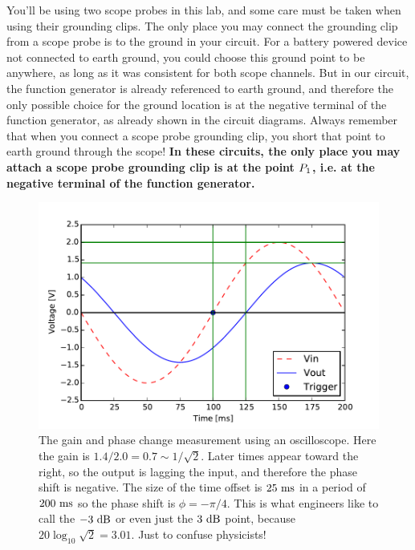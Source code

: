 \documentclass[12pt]{article}
\begin{document}
\noindent
You'll be using two scope probes in this lab, and some care must be taken when using their grounding clips.  The only place you may connect the grounding clip from a scope probe is to the ground in your circuit. For a battery powered device not connected to earth ground, you could choose this ground point to be anywhere, as long as it was consistent for both scope channels.  But in our circuit, the function generator is already referenced to earth ground, and therefore the only possible choice for the ground location is at the negative terminal of the function generator, as already shown in the circuit diagrams.  Always remember that when you connect a scope probe grounding clip, you short that point to earth ground through the scope!  {\bf In these circuits, the only place you may attach a scope probe grounding clip is at the point $\boldmath P_1$, i.e. at the negative terminal of the function generator.}


\begin{figure}[htbp]
\begin{center}
\includegraphics[height=0.35\textheight]{figs/scope_gain.pdf}
\end{center}
\caption{\label{fig:scopegain} The gain and phase change measurement using an oscilloscope.
Here the gain is $1.4/2.0 = 0.7 \sim 1/\sqrt{2}$.  Later times appear toward the right, so the output is lagging the input, and therefore the phase shift is negative.  The size of the time offset is $25~\rm ms$ in a period of $200~\rm ms$ so the phase shift is $\phi = -\pi/4$.  This is what engineers like to call the $-3~\rm dB$ or even just the $3~\rm dB$ point, because $20 \log_{10} \sqrt{2} = 3.01$.  Just to confuse physicists!}
\end{figure}
\end{document}
